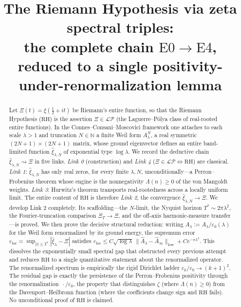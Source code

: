 \documentclass[11pt]{amsart}
\title[The CCM chain for RH, reduced to one positivity lemma]{The Riemann Hypothesis via zeta spectral triples:\\
the complete chain $\mathrm{E}0\to\mathrm{E}4$,\\
reduced to a single positivity-under-renormalization lemma}
\author{}
\date{}
\theoremstyle{definition}
\theoremstyle{remark}
\newcommand{\RH}{\mathrm{RH}}
\newcommand{\bbN}{\mathbb{N}}
\newcommand{\xih}{\widehat{\xi}}
\newcommand{\Ah}{\widehat{A}}
\newcommand{\Lam}{\Lambda}
\newcommand{\LP}{\mathcal{LP}}
\begin{document}
\begin{abstract}
Let $\Xi(t)=\xi(\tfrac12+it)$ be Riemann's entire function, so that the
Riemann Hypothesis ($\RH$) is the assertion $\Xi\in\LP$ (the Laguerre--P\'olya
class of real-rooted entire functions). In the Connes--Consani--Moscovici
framework one attaches to each scale $\lambda>1$ and truncation
$N\in\bbN$ a finite Weil form $A_\lambda^N$, a real symmetric
$(2N+1)\times(2N+1)$ matrix, whose ground eigenvector defines an entire
band-limited function $\xih_{\lambda,N}$ of exponential type $\log\lambda$.
We record the deductive chain $\xih_{\lambda,N}\rightsquigarrow\Xi$ in five
links. \emph{Link 0} (construction) and \emph{Link 4} ($\Xi\in\LP\iff\RH$)
are classical. \emph{Link 1}: $\xih_{\lambda,N}$ has only real zeros, for
every finite $\lambda,N$, unconditionally---a Perron--Frobenius theorem whose
engine is the nonnegativity $\Lam(n)\geq0$ of the von Mangoldt weights.
\emph{Link 3}: Hurwitz's theorem transports real-rootedness across a locally
uniform limit. The entire content of $\RH$ is therefore \emph{Link 2}, the
convergence $\xih_{\lambda,N}\to\Xi$. We develop Link 2 completely. Its
scaffolding---the $N$-limit, the Nyquist horizon $T^\ast\sim2\pi\lambda^2$,
the Fourier-truncation comparison $\Xi_T\to\Xi$, and the off-axis
harmonic-measure transfer---is proved. We then prove the decisive structural
reduction: writing $\Ah_\lambda:=A_\lambda/\varepsilon_0(\lambda)$ for the
Weil form renormalized by its ground energy, the supremum error
$\varepsilon_{\mathrm{loc}}=\sup_{|t|\leq T^\ast}|\xih_{\lambda}-\Xi|$
satisfies $\varepsilon_{\mathrm{loc}}\leq C\sqrt{\log\lambda}\,
\|\Ah_\lambda-\Ah_\infty\|_{\mathrm{low}}+Ce^{-\pi\lambda^2}$. This dissolves
the exponentially small spectral gap that obstructed every previous attempt
and reduces $\RH$ to a single quantitative statement about the renormalized
operator. The renormalized spectrum is empirically the rigid Dirichlet ladder
$\varepsilon_k/\varepsilon_0\to(k+1)^2$. The residual gap is exactly the
persistence of the Perron--Frobenius positivity through the renormalization
$\,\cdot/\varepsilon_0$, the property that distinguishes $\zeta$ (where
$\Lam(n)\geq0$) from the Davenport--Heilbronn function (where the
coefficients change sign and $\RH$ fails). No unconditional proof of $\RH$ is
claimed.
\end{abstract}

\maketitle
\tableofcontents
\end{document}
